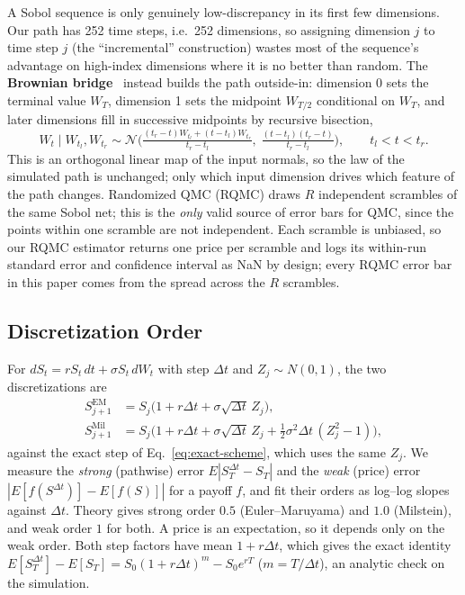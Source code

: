 \documentclass[sigconf]{acmart}
\begin{document}
A Sobol sequence is only genuinely low-discrepancy in its first few
dimensions. Our path has 252 time steps, i.e.\ 252 dimensions, so assigning
dimension $j$ to time step $j$ (the ``incremental'' construction) wastes most
of the sequence's advantage on high-index dimensions where it is no better
than random. The \textbf{Brownian bridge}~\cite{CaflischMorokoffOwen1997}
instead builds the path outside-in: dimension 0 sets the terminal value
$W_T$, dimension 1 sets the midpoint $W_{T/2}$ conditional on $W_T$, and
later dimensions fill in successive midpoints by recursive bisection,
\begin{equation}
  W_t \mid W_{t_l}, W_{t_r} \sim \mathcal N\!\Big(
    \tfrac{(t_r-t)W_{t_l}+(t-t_l)W_{t_r}}{t_r-t_l},\;
    \tfrac{(t-t_l)(t_r-t)}{t_r-t_l}\Big),
  \qquad t_l<t<t_r.
  \label{eq:bridge}
\end{equation}
This is an orthogonal linear map of the input normals, so the law of the
simulated path is unchanged; only which input dimension drives which
feature of the path changes. Randomized QMC (RQMC) draws $R$ independent
scrambles of the same Sobol net; this is the \emph{only} valid source of
error bars for QMC, since the points within one scramble are not
independent. Each scramble is unbiased, so our RQMC estimator returns one
price per scramble and logs its within-run standard error and confidence
interval as NaN by design; every RQMC error bar in this paper comes from the
spread across the $R$ scrambles.

\subsection{Discretization Order}
\label{sec:scheme-method}
For $dS_t=rS_t\,dt+\sigma S_t\,dW_t$ with step $\Delta t$ and
$Z_j\sim N(0,1)$, the two discretizations are
\begin{align}
  S_{j+1}^{\mathrm{EM}} &= S_j\big(1+r\Delta t+\sigma\sqrt{\Delta t}\,Z_j\big),
  \label{eq:em}\\
  S_{j+1}^{\mathrm{Mil}} &= S_j\big(1+r\Delta t+\sigma\sqrt{\Delta t}\,Z_j
    + \tfrac12\sigma^2\Delta t\,(Z_j^2-1)\big),
  \label{eq:milstein}
\end{align}
against the exact step of Eq.~\ref{eq:exact-scheme}, which uses the same
$Z_j$. We measure the \emph{strong} (pathwise) error
$E|S_T^{\Delta t}-S_T|$ and the \emph{weak} (price) error
$|E[f(S^{\Delta t})]-E[f(S)]|$ for a payoff $f$, and fit their orders as
log--log slopes against $\Delta t$. Theory gives strong order $0.5$
(Euler--Maruyama) and $1.0$ (Milstein), and weak order $1$ for both. A price
is an expectation, so it depends only on the weak order. Both step factors
have mean $1+r\Delta t$, which gives the exact identity
$E[S_T^{\Delta t}]-E[S_T]=S_0(1+r\Delta t)^m-S_0e^{rT}$ ($m=T/\Delta t$), an
analytic check on the simulation.
\end{document}
